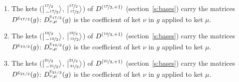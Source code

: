 \documentclass[10pt,a4paper]{article}
\numberwithin{equation}{section}
\newcommand{\irr}[1]{\text{\normalfont\scshape #1}}
\newcommand{\irrJp}[2]{D^{(#1,#2)}}
\newcommand{\repD}[1]{D^{#1}}
\newcommand{\intx}{\mu}
\newcommand{\jm}[2]{\bigl\lvert{}^{#1}_{\,#2}\bigr\rangle}
\newenvironment{romanlist}{\begin{enumerate}%
\renewcommand{\labelenumi}{(\roman{enumi})}}%
  {\end{enumerate}}
\begin{document}
\begin{romanlist}
\item The kets ($\jm{\nicefrac{17}{2}}{-\nicefrac{17}{2}}$, $\jm{\nicefrac{17}{2}}{\nicefrac{17}{2}}$) of $\irrJp{\nicefrac{17}{2}}{+1}$ (section~\ref{s:bases}) carry the matrices $\repD{\irr{e}_{17/2}}(g)$: $\repD{\irr{e}_{17/2}}_{\nu,\intx}(g)$ is the coefficient of ket $\nu$ in $g$ applied to ket $\intx$.
\item The kets ($\jm{\nicefrac{19}{2}}{-\nicefrac{19}{2}}$, $\jm{\nicefrac{19}{2}}{\nicefrac{19}{2}}$) of $\irrJp{\nicefrac{19}{2}}{+1}$ (section~\ref{s:bases}) carry the matrices $\repD{\irr{e}_{19/2}}(g)$: $\repD{\irr{e}_{19/2}}_{\nu,\intx}(g)$ is the coefficient of ket $\nu$ in $g$ applied to ket $\intx$.
\item The kets ($\jm{\nicefrac{21}{2}}{-\nicefrac{21}{2}}$, $\jm{\nicefrac{21}{2}}{\nicefrac{21}{2}}$) of $\irrJp{\nicefrac{21}{2}}{+1}$ (section~\ref{s:bases}) carry the matrices $\repD{\irr{e}_{21/2}}(g)$: $\repD{\irr{e}_{21/2}}_{\nu,\intx}(g)$ is the coefficient of ket $\nu$ in $g$ applied to ket $\intx$.
\end{romanlist}
\end{document}
